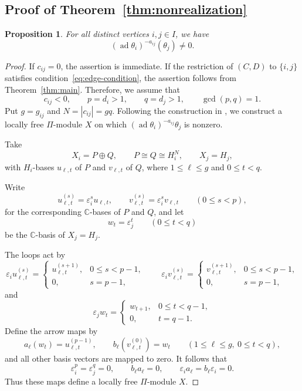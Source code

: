 \documentclass[12pt,reqno]{amsart}
\numberwithin{equation}{section}
\newtheorem{proposition}[theorem]{Proposition}
\theoremstyle{definition}
\theoremstyle{remark}
\newcommand{\C}{\mathbb C}
\newcommand{\ad}{\operatorname{ad}}
\theoremstyle{plain}
\theoremstyle{plain}
\begin{document}
\subsection{Proof of Theorem~\ref{thm:nonrealization}}
\begin{proposition}\label{prop:sharp-Serre}
For all distinct vertices $i,j\in I$, we have
\[
    (\ad\theta_i)^{-a_{ij}}(\theta_j)\ne0.
\]
\end{proposition}
\begin{proof}
    If $c_{ij}=0$, the assertion is immediate. If the restriction of $(C,D)$ to $\{i,j\}$ satisfies condition~\eqref{eq:edge-condition}, the assertion follows from Theorem~\ref{thm:main}. Therefore, we assume that 
    \[
    c_{ij}<0,\qquad p=d_i>1,\qquad q=d_j>1,\qquad \gcd(p,q)=1.
    \]
Put $g=g_{ij}$ and $N=|c_{ij}|=gq$. Following the construction in \cite[Lemma~6.1]{GLS18},
we construct a locally free $\Pi$-module $X$ on which $(\ad\theta_i)^{-a_{ij}}\theta_j$ is nonzero.

Take
\[
    X_i=P\oplus Q,\qquad P\cong Q\cong H_i^N,
    \qquad X_j=H_j,
\]
with $H_i$-bases $u_{\ell,t}$ of $P$ and $v_{\ell,t}$ of $Q$, where $1\le\ell\le g$ and $0\le t<q$.

Write
\[
    u_{\ell,t}^{(s)}=\varepsilon_i^s u_{\ell,t},
    \qquad
    v_{\ell,t}^{(s)}=\varepsilon_i^s v_{\ell,t}
    \qquad(0\le s<p),
\]
for the corresponding $\C$-bases of $P$ and $Q$, and let 
\[
    w_t=\varepsilon_j^t \qquad (0\le t<q)
\]
be the $\C$-basis of $X_j=H_j$.

The loops act by
\[
    \varepsilon_i u_{\ell,t}^{(s)}
    =
    \begin{cases}
        u_{\ell,t}^{(s+1)}, & 0\le s<p-1,\\
        0, & s=p-1,
    \end{cases}
    \qquad
    \varepsilon_i v_{\ell,t}^{(s)}
    =
    \begin{cases}
        v_{\ell,t}^{(s+1)}, & 0\le s<p-1,\\
        0, & s=p-1,
    \end{cases}
\]
and
\[
    \varepsilon_j w_t
    =
    \begin{cases}
        w_{t+1}, & 0\le t<q-1,\\
        0, & t=q-1.
    \end{cases}
\]
Define the arrow maps by
\[
    a_\ell(w_t)=u_{\ell,t}^{(p-1)},
    \qquad
    b_\ell(v_{\ell,t}^{(0)})=w_t
    \qquad(1\le\ell\le g,\ 0\le t<q),
\]
and all other basis vectors are mapped to zero. It follows that
\[
    \varepsilon_i^p=\varepsilon_j^q=0,\qquad
    b_\ell a_\ell=0,\qquad
    \varepsilon_i a_\ell=b_\ell\varepsilon_i=0.
\]
Thus these maps define a locally free $\Pi$-module $X$.


\end{proof}
\end{document}
